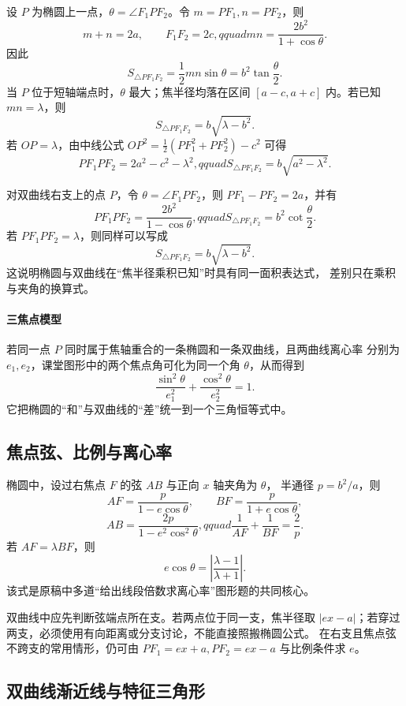 \documentclass[UTF8]{ctexart}
\begin{document}
	设 $P$ 为椭圆上一点，$\theta=\angle F_1PF_2$。令
	$m=PF_1,n=PF_2$，则
	\[
	 m+n=2a,\qquad F_1F_2=2c,qquad
	 mn=\frac{2b^2}{1+\cos\theta}.
	\]
	因此
	\[
	 S_{\triangle PF_1F_2}
	 =\frac12mn\sin\theta=b^2\tan\frac\theta2.
	\]
	当 $P$ 位于短轴端点时，$\theta$ 最大；焦半径均落在区间
	$[a-c,a+c]$ 内。若已知 $mn=\lambda$，则
	\[
	 S_{\triangle PF_1F_2}=b\sqrt{\lambda-b^2}.
	\]
	若 $OP=\lambda$，由中线公式
	$OP^2=\tfrac12(PF_1^2+PF_2^2)-c^2$ 可得
	\[
	 PF_1PF_2=2a^2-c^2-\lambda^2,qquad
	 S_{\triangle PF_1F_2}=b\sqrt{a^2-\lambda^2}.
	\]

	对双曲线右支上的点 $P$，令
	$\theta=\angle F_1PF_2$，则 $PF_1-PF_2=2a$，并有
	\[
	 PF_1PF_2=\frac{2b^2}{1-\cos\theta},qquad
	 S_{\triangle PF_1F_2}=b^2\cot\frac\theta2.
	\]
	若 $PF_1PF_2=\lambda$，则同样可以写成
	\[
	 S_{\triangle PF_1F_2}=b\sqrt{\lambda-b^2}.
	\]
	这说明椭圆与双曲线在“焦半径乘积已知”时具有同一面积表达式，
	差别只在乘积与夹角的换算式。

	\paragraph{三焦点模型}
	若同一点 $P$ 同时属于焦轴重合的一条椭圆和一条双曲线，且两曲线离心率
	分别为 $e_1,e_2$，课堂图形中的两个焦点角可化为同一个角 $\theta$，从而得到
	\[
	 \boxed{\frac{\sin^2\theta}{e_1^2}+\frac{\cos^2\theta}{e_2^2}=1}.
	\]
	它把椭圆的“和”与双曲线的“差”统一到一个三角恒等式中。

	\subsection{焦点弦、比例与离心率}

	椭圆中，设过右焦点 $F$ 的弦 $AB$ 与正向 $x$ 轴夹角为 $\theta$，
	半通径 $p=b^2/a$，则
	\[
	 AF=\frac{p}{1-e\cos\theta},\qquad
	 BF=\frac{p}{1+e\cos\theta},
	\]
	\[
	 AB=\frac{2p}{1-e^2\cos^2\theta},qquad
	 \frac1{AF}+\frac1{BF}=\frac2p.
	\]
	若 $AF=\lambda BF$，则
	\[
	 \boxed{e\cos\theta=\left|\frac{\lambda-1}{\lambda+1}\right|}.
	\]
	该式是原稿中多道“给出线段倍数求离心率”图形题的共同核心。

	双曲线中应先判断弦端点所在支。若两点位于同一支，焦半径取
	$|ex-a|$；若穿过两支，必须使用有向距离或分支讨论，不能直接照搬椭圆公式。
	在右支且焦点弦不跨支的常用情形，仍可由
	$PF_1=ex+a,PF_2=ex-a$ 与比例条件求 $e$。

	\subsection{双曲线渐近线与特征三角形}
\end{document}
